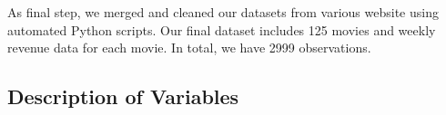 \documentclass[10.7pt]{article} %
\begin{document}
As final step, we merged and cleaned our datasets from various website using automated Python scripts. Our final dataset includes 125 movies and weekly revenue data for each movie. In total, we have 2999 observations. 

\subsection{Description of Variables}

\begin{table}[h]
\caption{Dependent Variable}
\label{tab:my-table}

\end{table}
\end{document}
